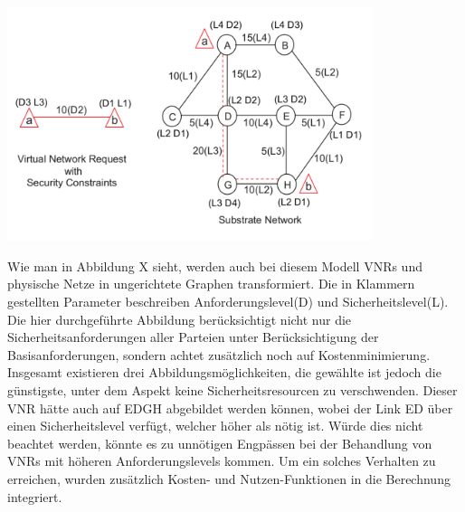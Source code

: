\documentclass{lni}
\begin{document}
\begin{center}
	\includegraphics[width=0.8\textwidth]{algo2graph.pdf}\newline
\end{center}
Wie man in Abbildung X sieht, werden auch bei diesem Modell VNRs und physische Netze in ungerichtete Graphen transformiert. Die in Klammern gestellten Parameter beschreiben Anforderungslevel(D) und Sicherheitslevel(L). Die hier durchgeführte Abbildung berücksichtigt nicht nur die Sicherheitsanforderungen aller Parteien unter Berücksichtigung der Basisanforderungen, sondern achtet zusätzlich noch auf Kostenminimierung. Insgesamt existieren drei Abbildungsmöglichkeiten, die gewählte ist jedoch die günstigste, unter dem Aspekt keine Sicherheitsresourcen zu verschwenden. Dieser VNR hätte auch auf EDGH abgebildet werden können, wobei der Link ED über einen Sicherheitslevel verfügt, welcher höher als nötig ist. Würde dies nicht beachtet werden, könnte es zu unnötigen Engpässen bei der Behandlung von VNRs mit höheren Anforderungslevels kommen. Um ein solches Verhalten zu erreichen, wurden zusätzlich Kosten- und Nutzen-Funktionen in die Berechnung integriert.
\end{document}
